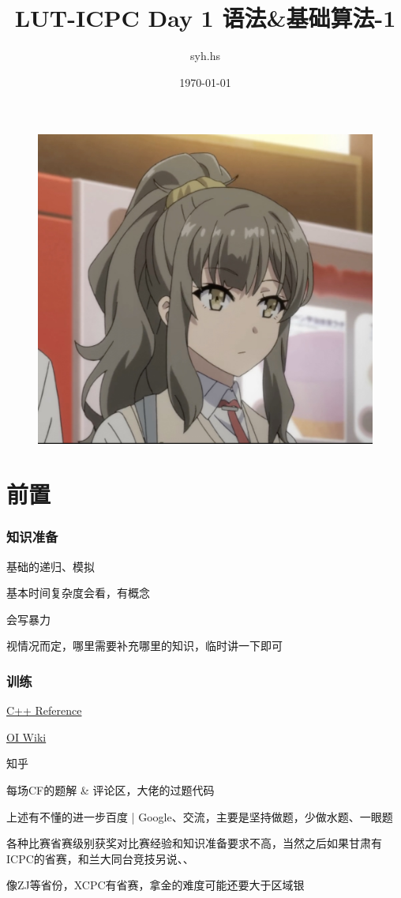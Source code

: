 \documentclass{beamer}
\author{syh.hs}
\title{LUT-ICPC Day 1 语法\&基础算法-1}
\date{\today}
\institute{兰州理工大学}
\begin{document}

  

  \begin{frame}[plain]
    \maketitle
    \begin{figure}[htbp] %
    \centering %
    \includegraphics[width=0.3\textheight,height=0.2\textwidth]{graph/new- 2.jpg} %
    \end{figure}
  \end{frame}

  
  \section{前置}

  \begin{frame}
    \frametitle{知识准备}
    基础的递归、模拟

    基本时间复杂度会看，有概念

    会写暴力

    视情况而定，哪里需要补充哪里的知识，临时讲一下即可
  \end{frame}
  \begin{frame}
    \frametitle{训练}
    \href{https://en.cppreference.com/w/}{C++ Reference}

    \href{https://oi-wiki.org/}{OI Wiki}

    知乎

    每场CF的题解 \& 评论区，大佬的过题代码

    \vspace*{1\baselineskip}
    
    上述有不懂的进一步百度 | Google、交流，主要是坚持做题，少做水题、一眼题
    
    \vspace*{1\baselineskip}
    
    各种比赛省赛级别获奖对比赛经验和知识准备要求不高，当然之后如果甘肃有ICPC的省赛，和兰大同台竞技另说、、
    
    \vspace*{1\baselineskip}

    像ZJ等省份，XCPC有省赛，拿金的难度可能还要大于区域银
  \end{frame}
\end{document}
